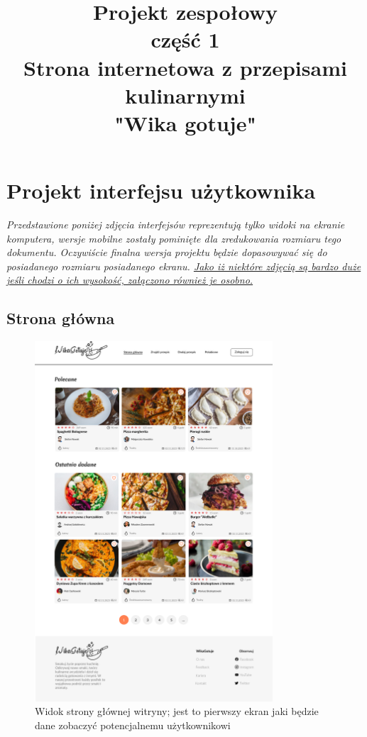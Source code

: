 \documentclass{article}
\title{\fontsize{20}{22}\selectfont Projekt zespołowy\\ część 1\\Strona internetowa z przepisami kulinarnymi\\"Wika gotuje"}
\date{}
\begin{document}
\section{Projekt interfejsu użytkownika}
\textit{Przedstawione poniżej zdjęcia interfejsów reprezentują tylko widoki na ekranie komputera, wersje mobilne zostały pominięte dla zredukowania rozmiaru tego dokumentu. Oczywiście
finalna wersja projektu będzie dopasowywać się do posiadanego rozmiaru posiadanego ekranu. \underline{Jako iż niektóre zdjęcią są bardzo duże jeśli chodzi o ich wysokość, załączono
również je osobno.}}

\subsection{Strona główna}
\begin{figure}[H]
    \begin{center}
        \includegraphics[width=0.79\textwidth]{mockups/main_page}
    \end{center}
    \caption{Widok strony głównej witryny; jest to pierwszy ekran jaki będzie dane zobaczyć potencjalnemu użytkownikowi}
    \label{fig:main_page}
\end{figure}
    
\end{document}
